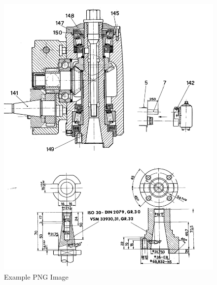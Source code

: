 \newpage
\begin{figure}[h]
    \centering
    \includegraphics[width=1.0\linewidth]{images/page_35}
    \caption{Example PNG Image}
    \label{fig:milling_head}
\end{figure}
